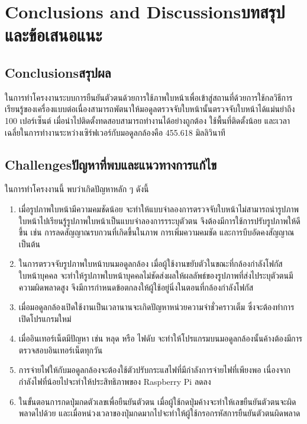 \chapter{\ifenglish Conclusions and Discussions\else บทสรุปและข้อเสนอแนะ\fi}

\section{\ifenglish Conclusions\else สรุปผล\fi}

ในการทำโครงงานระบบการยืนยันตัวตนด้วยการใช้ภาพใบหน้าเพื่อเข้าสู่สถานที่ด้วยการใช้กลวิธีการเรียนรู้ของเครื่องแบบต่อเนื่องสามารถพัตนาให้มอดูลตรวจจับใบหน้านั้นตรวจจับใบหน้าได้แม่นยำถึง 100 เปอร์เซ็นต์ 
เมื่อนำไปติดตั้งทดสอบสามารถทำงานได้อย่างถูกต้อง ใช้พื้นที่ติดตั้งน้อย และเวลาเฉลี่ยในการทำงานระหว่างเซิร์ฟเวอร์กับมอดูลกล้องคือ 455.618 มิลลิวินาที


\section{\ifenglish Challenges\else ปัญหาที่พบและแนวทางการแก้ไข\fi}

ในการทำโครงงานนี้ พบว่าเกิดปัญหาหลัก ๆ ดังนี้
\begin{enumerate}
    \item เมื่อรูปภาพใบหน้ามีความคมชัดน้อย จะทำให้แบบจำลองการตรวจจับใบหน้าไม่สามารถนำรูปภาพใบหน้าไปเรียนรู้รูปภาพใบหน้าเป็นแบบจำลองการรระบุตัวตน จึงต้องมีการใช้การปรับรูปภาพให้ดีขึ้น เช่น การลดสัญญาณรบกวนที่เกิดขึ้นในภาพ การเพิ่มความคมชัด 
    และการบีบอัดคงสัญญาณ เป็นต้น
    \item ในการตรวจจับรูปภาพใบหน้าบนมอดูลกล้อง เมื่อผู้ใช้งานขยับตัวในขณะที่กล้องกำลังโฟกัสใบหน้าบุคคล จะทำให้รูปภาพใบหน้าบุคคลไม่ชัดส่งผลให้ผลลัพธ์ของรูปภาพที่ส่งไประบุตัวตนมีความผิดพลาดสูง 
    จึงมีการกำหนดข้อตกลงให้ผู้ใช้อยู่นิ่งในตอนที่กล้องกำลังโฟกัส
    \item เมื่อมอดูลกล้องเปิดใช้งานเป็นเวลานานจะเกิดปัญหาหน่วยความจำชั่วคราวเต็ม ซึ่งจะต้องทำการเปิดโปรแกรมใหม่
    \item เมื่ออินเทอร์เน็ตมีปัญหา เช่น หลุด หรือ ไฟดับ จะทำให้โปรแกรมบนมอดูลกล้องนั้นค้างต้องมีการตรวจสอบอินเทอร์เน็ตทุกวัน
    \item การจ่ายไฟให้กับมอดูลกล้องจะต้องใช้ตัวปรับกระแสไฟที่มีกำลังการจ่ายไฟที่เพียงพอ เนื่องจากกำลังไฟที่น้อยไปจะทำให้ประสิทธิภาพของ Raspberry Pi ลดลง
    \item ในขั้นตอนการกดปุ่มกดตัวเลขเพื่อยืนยันตัวตน เมื่อผู้ใช้กดปุ่มค้างจะทำให้เลขยืนยันตัวตนจะผิดพลาดไปด้วย และเมื่อหน่วงเวลาของปุ่มกดมากไปจะทำให้ผู้ใช้กรอกรหัสการยืนยันตัวตนผิดพลาด
\end{enumerate}



